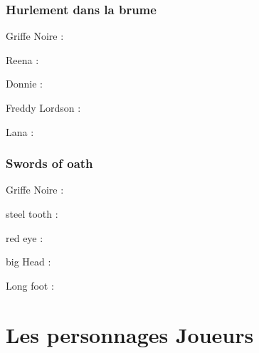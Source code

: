 \documentclass[oneside,12pt]{book}
\begin{document}
\begin{flushleft}
\subsection{Hurlement dans la brume}
\item[Griffe Noire]: 
\item[Reena]: 
\item[Donnie]: 
\item[Freddy Lordson]: 
\item[Lana]: 

\subsection{Swords of oath}
\item[Griffe Noire]: 
\item[steel tooth]: 
\item[red eye]: 
\item[big Head]: 
\item[Long foot]: 


\clearpage
\chapter{Les personnages Joueurs}
\clearpage

\end{flushleft}
\end{document}
